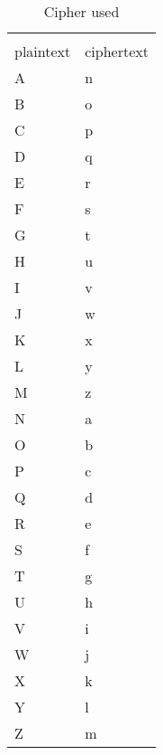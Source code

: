\documentclass[11pt]{article}
\begin{document}
\begin{table}[htb]
\caption{Cipher used}
\centering
\begin{tabular}{ll}
 & \\
plaintext & ciphertext\\
A & n\\
B & o\\
C & p\\
D & q\\
E & r\\
F & s\\
G & t\\
H & u\\
I & v\\
J & w\\
K & x\\
L & y\\
M & z\\
N & a\\
O & b\\
P & c\\
Q & d\\
R & e\\
S & f\\
T & g\\
U & h\\
V & i\\
W & j\\
X & k\\
Y & l\\
Z & m\\
\end{tabular}
\end{table}
\end{document}
